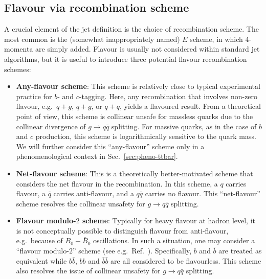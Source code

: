 \documentclass[nofootinbib,twocolumn,preprintnumbers,superscriptaddress,aps]{revtex4-2}
\begin{document}
\subsection{Flavour via recombination scheme}
\label{sec:flavour-recomb}

A crucial element of the jet definition is the choice of recombination
scheme.
%
The most common is the (somewhat inappropriately named) $E$ scheme, in
which 4-momenta are simply added.
%
Flavour is usually not considered within standard jet algorithms, but
it is useful to introduce three potential flavour recombination
schemes:
%  
\begin{itemize}
\item \textbf{Any-flavour scheme}:
%
 This scheme is relatively close to typical experimental
 practice for $b$- and $c$-tagging.
 Here, any recombination that involves non-zero flavour, e.g.\ $q+g$,
 $\bar q+g$, or $q+\bar q$, yields a flavoured result. 
  From a theoretical point of view, this scheme is collinear unsafe for massless quarks
  due to the collinear divergence of $g \to q\bar q$ splitting.
  For massive quarks, as in the case of $b$ and $c$ production, this scheme is logarithmically sensitive to the quark mass.
  We will further consider this ``any-flavour'' scheme only in a phenomenological context in Sec.~\ref{sec:pheno-ttbar}.

\item \textbf{Net-flavour scheme}:
%
This is a theoretically better-motivated scheme that considers the net
  flavour in the recombination.
  In this scheme, a $q$ carries flavour, a $\bar q$ carries
  anti-flavour, and a $q\bar q$ carries no flavour.
  This ``net-flavour'' scheme resolves the collinear unsafety for $g\to q\bar q$ splitting.

\item \textbf{Flavour modulo-$2$ scheme}:
%
Typically for heavy flavour at hadron level, it is not
  conceptually possible to distinguish flavour from anti-flavour,
  e.g.\ because of $B_0{-}\bar B_0$ oscillations.
  In such a situation, one may consider a ``flavour modulo-$2$'' scheme
  (see e.g.\ Ref.~\cite{Banfi:2007gu}).
  Specifically, $b$ and $\bar b$ are
  treated as equivalent while $b\bar b$, $bb$ and $\bar b \bar b$ are
  all considered to be flavourless.
  This scheme also resolves the issue of collinear unsafety for
  $g\to q\bar q$ splitting.
\end{itemize}
\end{document}
